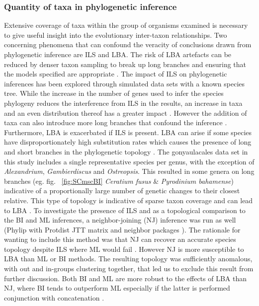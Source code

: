 \documentclass[12pt]{article}
\begin{document}
\subsubsection{Quantity of taxa in phylogenetic inference}
Extensive coverage of taxa within the group of organisms examined is necessary to give useful insight into the evolutionary inter-taxon relationships.
Two concerning phenomena that can confound the veracity of conclusions drawn from phylogenetic inference are ILS and LBA. 
The risk of LBA artefacts can be reduced by denser taxon sampling to break up long branches and ensuring that the models specified are appropriate \cite{heath2008taxon}. 
The impact of ILS on phylogenetic inferences has been explored through simulated data sets with a known species tree. 
While the increase in the number of genes used to infer the species phylogeny reduces the interference from ILS in the results, an increase in taxa and an even distribution thereof has a greater impact \cite{maddison2006inferring}.
However the addition of taxa can also introduce more long branches that confound the inference \cite{heath2008taxon}. 
Furthermore, LBA is exacerbated if ILS is present. 
LBA can arise if some species have disproportionately high substitution rates which causes the presence of long and short branches in the phylogenetic topology \cite{liu2014coalescent}. 
The gonyaulacales data set in this study includes a single representative species per genus, with the exception of \textit{Alexandrium}, \textit{Gambierdiscus} and \textit{Ostreopsis}. 
This resulted in some genera on long branches (eg. fig. ~\ref{fig:SCmscBI} \textit{Ceratium fusus} \& \textit{Pyrodinium bahamense}) indicative of a proportionally large number of genetic changes to their closest relative.
This type of topology is indicative of sparse taxon coverage and can lead to LBA \cite{heath2008taxon}. 
To investigate the presence of ILS and as a topological comparison to the BI and ML inferences, a neighbor-joining (NJ) inference was run as well (Phylip with Protdist JTT matrix and neighbor packages \cite{felsenstein2005phylip}). 
The rationale for wanting to include this method was that NJ can recover an accurate species topology despite ILS where ML would fail  \cite{mendes2017concatenation}.
However NJ is more susceptible to LBA than ML or BI methods. 
The resulting topology was sufficiently anomalous, with out and in-groups clustering together, that led us to exclude this result from further discussion. 
Both BI and ML are more robust to the effects of LBA than NJ, where BI tends to outperform ML especially if the latter is performed conjunction with concatenation \cite{kubatko2007inconsistency,roch2015likelihood}. 
\end{document}
